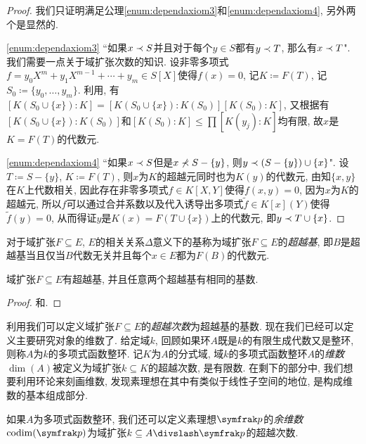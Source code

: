 \begin{proof}
  我们只证明满足公理\ref{enum:dependaxiom3}和\ref{enum:dependaxiom4}, 另外两个是显然的.

  \ref{enum:dependaxiom3} ``如果$x\prec S$并且对于每个$y\in S$都有$y\prec T$, 那么有$x\prec T$". 我们需要一点关于域扩张次数的知识. 设非零多项式$f=y_0X^m+ y_1X^{m-1}+ \dotsb + y_m\in S[X]$使得$f(x)=0$, 记$K\coloneq F(T)$, 记$S_0\coloneq \{y_0, \dotsc, y_m\}$. 利用, 有$[K(S_0\cup\{x\}):K]=[K(S_0\cup\{x\}):K(S_0)][K(S_0):K]$, 又根据有$[K(S_0\cup\{x\}):K(S_0)]$和$[K(S_0):K]\leq\prod [K(y_j):K]$均有限, 故$x$是$K=F(T)$的代数元.

  \ref{enum:dependaxiom4} ``如果$x\prec S$但是$x\nprec S-\{y\}$, 则$y\prec (S-\{y\})\cup\{x\}$". 设$T\coloneq S-\{y\}$, $K\coloneq F(T)$, 则$x$为$K$的超越元同时也为$K(y)$的代数元, 由知$\{x, y\}$在$K$上代数相关, 因此存在非零多项式$f\in K[X, Y]$使得$f(x, y)=0$, 因为$x$为$K$的超越元, 所以$f$可以通过合并系数以及代入诱导出多项式$\tilde{f}\in K[x](Y)$使得$\tilde{f}(y)=0$, 从而得证$y$是$K(x)=F(T\cup\{x\})$上的代数元, 即$y\prec T\cup \{x\}$.
\end{proof}

对于域扩张$F\subseteq E$, $E$的相关关系$\Delta$意义下的基称为域扩张$F\subseteq E$的\emph{超越基}, 即$B$是超越基当且仅当$B$代数无关并且每个$x\in E$都为$F(B)$的代数元.

\begin{theorem}\label{thm:tranbasis}
  域扩张$F\subseteq E$有超越基, 并且任意两个超越基有相同的基数.
\end{theorem}

\begin{proof}
  和.
\end{proof}

利用我们可以定义域扩张$F\subseteq E$的\emph{超越次数}为超越基的基数. 现在我们已经可以定义主要研究对象的维数了. 给定域$k$, 回顾如果环$A$既是$k$的有限生成代数又是整环, 则称$A$为$k$的多项式函数整环. 记$K$为$A$的分式域, 域$k$的多项式函数整环$A$的\emph{维数}$\dim (A)$被定义为域扩张$k\subseteq K$的超越次数, 是有限数. 在剩下的部分中, 我们想要利用环论来刻画维数, 发现素理想在其中有类似于线性子空间的地位, 是构成维数的基本组成部分.

如果$A$为多项式函数整环, 我们还可以定义素理想$\ideal{p}$的\emph{余维数}$\codim (\ideal{p})$为域扩张$k\subseteq A{\divslash}\ideal{p}$的超越次数.

